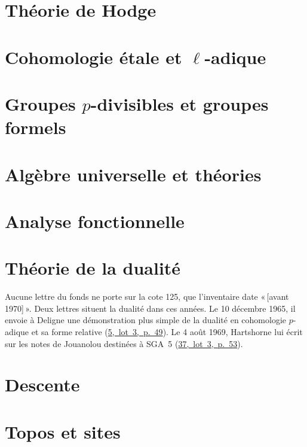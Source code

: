 \documentclass[11pt]{article}
\newcommand{\q}[1]{«\,#1\,»}
\newcommand{\lot}[3]{\mbox{\href{https://grothendieck.commutator.io/\##1/#2/p#3}{#1, lot #2, p.~#3}}}
\newcommand{\lettres}[1]{{\small #1\par}\medskip}
\theoremstyle{plain}
\theoremstyle{definition}
\theoremstyle{plain}
\theoremstyle{definition}
\theoremstyle{remark}
\renewcommand{\_}{\bkunderscore\allowbreak}
\begin{document}
\part{Théorie de Hodge}



\part{Cohomologie étale et $\ell$-adique}


\part{Groupes $p$-divisibles et groupes formels}


\part{Algèbre universelle et théories}


\part{Analyse fonctionnelle}



\part{Théorie de la dualité}
\lettres{Aucune lettre du fonds ne porte sur la cote 125, que l'inventaire date \q{[avant 1970]}. Deux lettres situent la dualité dans ces années. Le 10 décembre 1965, il envoie à Deligne une démonstration plus simple de la dualité en cohomologie $p$-adique et sa forme relative (\lot{5}{3}{49}). Le 4 août 1969, Hartshorne lui écrit sur les notes de Jouanolou destinées à SGA~5 (\lot{37}{3}{53}).}






\part{Descente}




\part{Topos et sites}



\end{document}
